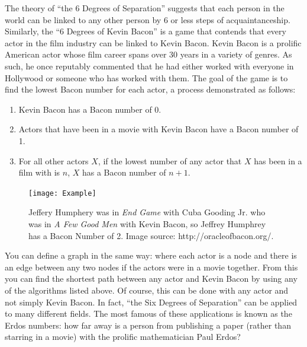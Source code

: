 The theory of ``the 6 Degrees of Separation'' suggests that each person in the world can be linked to any other person by 6 or less steps of acquaintanceship.
Similarly, the ``6 Degrees of Kevin Bacon'' is a game that contends that every actor in the film industry can be linked to Kevin Bacon. Kevin Bacon is a prolific American actor whose film career spans over 30 years in a variety of genres. As such, he once reputably commented that he had either worked with everyone in Hollywood or someone who has worked with them. The goal of the game is to find the lowest Bacon number for each actor, a process demonstrated as follows:
\begin{enumerate}
\item Kevin Bacon has a Bacon number of 0.
\item Actors that have been in a movie with Kevin Bacon have a Bacon number of 1.
\item For all other actors $X$, if the lowest number of any actor that $X$ has been in a film with is $n$, $X$ has a Bacon number of $n+1$.
\end{enumerate}

\begin{figure}[h]
\texttt{[image: Example]}
\caption{Jeffery Humphery was in \emph{End Game} with Cuba Gooding Jr. who was in \emph{A Few Good Men} with Kevin Bacon, so Jeffrey Humphrey has a Bacon Number of 2.  Image source: http://oracleofbacon.org/.}
\end{figure}

You can define a graph in the same way: where each actor is a node and there is an edge between any two nodes if the actors were in a movie together. From this you can find the shortest path between any actor and Kevin Bacon by using any of the algorithms listed above. Of course, this can be done with any actor and not simply Kevin Bacon. In fact, ``the Six Degrees of Separation'' can be applied to many different fields. The most famous of these applications is known as the Erdos numbers: how far away is a person from publishing a paper (rather than starring in a movie) with the prolific mathematician Paul Erdos?

